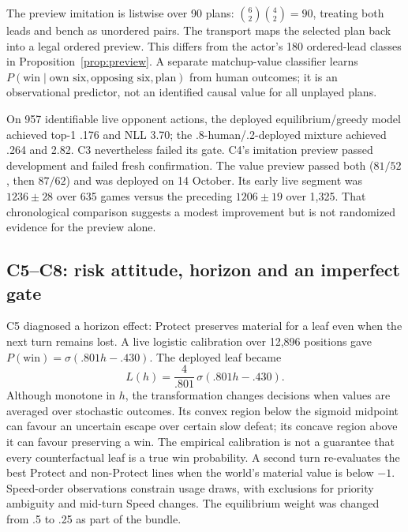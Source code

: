 The preview imitation is listwise over 90 plans:
$\binom62\binom42=90$, treating both leads and bench as unordered pairs.
The transport maps the selected plan back into a legal ordered preview.
This differs from the actor's 180 ordered-lead classes in
Proposition~\ref{prop:preview}. A separate matchup-value classifier learns
$P(\mathrm{win}\mid\text{own six},\text{opposing six},\text{plan})$ from
human outcomes; it is an observational predictor, not an identified causal
value for all unplayed plans.

On 957 identifiable live opponent actions, the deployed equilibrium/greedy
model achieved top-1 .176 and NLL 3.70; the .8-human/.2-deployed mixture
achieved .264 and 2.82. C3 nevertheless failed its gate. C4's imitation
preview passed development and failed fresh confirmation. The value preview
passed both ($81/52$, then $87/62$) and was deployed on 14 October. Its early
live segment was $1236\pm28$ over 635 games versus the preceding
$1206\pm19$ over 1,325. That chronological comparison suggests a modest
improvement but is not randomized evidence for the preview alone.


\subsection{C5--C8: risk attitude, horizon and an imperfect gate}
C5 diagnosed a horizon effect: Protect preserves material for a leaf even
when the next turn remains lost. A live logistic calibration over 12,896
positions gave $P(\mathrm{win})=\sigma(.801h-.430)$. The deployed leaf became
\begin{equation}
  L(h)=\frac4{.801}\,\sigma(.801h-.430).
  \label{eq:sigmoid-leaf}
\end{equation}
Although monotone in $h$, the transformation changes decisions when values
are averaged over stochastic outcomes. Its convex region below the sigmoid
midpoint can favour an uncertain escape over certain slow defeat; its concave
region above it can favour preserving a win. The empirical calibration is
not a guarantee that every counterfactual leaf is a true win probability.
A second turn re-evaluates the best Protect and non-Protect lines when the
world's material value is below $-1$. Speed-order observations constrain
usage draws, with exclusions for priority ambiguity and mid-turn Speed changes.
The equilibrium weight was changed from .5 to .25 as part of the bundle.

